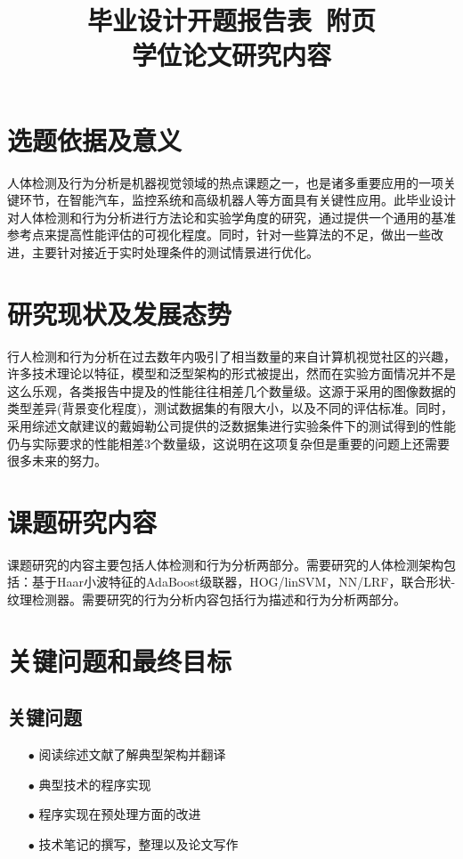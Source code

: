 \documentclass[12pt]{article}
\begin{document}
\title{毕业设计开题报告表~附页\\学位论文研究内容}
\author{}
\date{}
\maketitle
\section{选题依据及意义}
人体检测及行为分析是机器视觉领域的热点课题之一，也是诸多重要应用的一项关键环节，在智能汽车，监控系统和高级机器人等方面具有关键性应用。此毕业设计对人体检测和行为分析进行方法论和实验学角度的研究，通过提供一个通用的基准参考点来提高性能评估的可视化程度。同时，针对一些算法的不足，做出一些改进，主要针对接近于实时处理条件的测试情景进行优化。
\section{研究现状及发展态势}
行人检测和行为分析在过去数年内吸引了相当数量的来自计算机视觉社区的兴趣，许多技术理论以特征，模型和泛型架构的形式被提出，然而在实验方面情况并不是这么乐观，各类报告中提及的性能往往相差几个数量级。这源于采用的图像数据的类型差异(背景变化程度)，测试数据集的有限大小，以及不同的评估标准。同时，采用综述文献建议的戴姆勒公司提供的泛数据集进行实验条件下的测试得到的性能仍与实际要求的性能相差3个数量级，这说明在这项复杂但是重要的问题上还需要很多未来的努力。
\section{课题研究内容}
课题研究的内容主要包括人体检测和行为分析两部分。需要研究的人体检测架构包括：基于Haar小波特征的AdaBoost级联器，HOG/linSVM，NN/LRF，联合形状-纹理检测器。需要研究的行为分析内容包括行为描述和行为分析两部分。
\section{关键问题和最终目标}
\subsection{关键问题}
\begin{enumerate}
\item[$\bullet$]
阅读综述文献了解典型架构并翻译
\item[$\bullet$]
典型技术的程序实现
\item[$\bullet$]
程序实现在预处理方面的改进
\item[$\bullet$]
技术笔记的撰写，整理以及论文写作
\end{enumerate}
\end{document}
